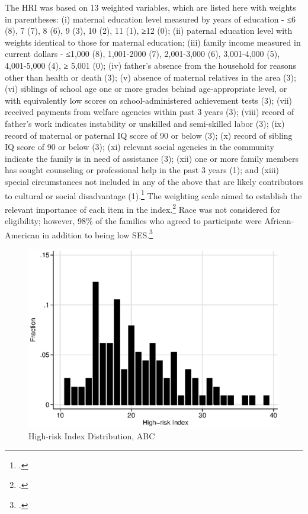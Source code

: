\begin{appendices}
\noindent The HRI was based on 13 weighted variables, which are listed here with weights in parentheses: (i) maternal education level measured by years of education - ≤6 (8), 7 (7), 8 (6), 9 (3), 10 (2), 11 (1), ≥12 (0); (ii) paternal education level with weights identical to those for maternal education; (iii) family income measured in current dollars - ≤1,000 (8), 1,001-2000 (7), 2,001-3,000 (6), 3,001-4,000 (5), 4,001-5,000 (4), ≥ 5,001 (0); (iv) father’s absence from the household for reasons other than health or death (3); (v) absence of maternal relatives in the area (3); (vi) siblings of school age one or more grades behind age-appropriate level, or with equivalently low scores on school-administered achievement tests (3); (vii) received payments from welfare agencies within past 3 years (3); (viii) record of father's work indicates instability or unskilled and semi-skilled labor (3); (ix) record of maternal or paternal IQ score of 90 or below (3); (x) record of sibling IQ score of 90 or below (3); (xi) relevant social agencies in the community indicate the family is in need of assistance (3); (xii) one or more family members has sought counseling or professional help in the past 3 years (1); and (xiii) special circumstances not included in any of the above that are likely contributors to cultural or social disadvantage (1).\footnote{\citet{Ramey_Smith_1977_AJMD, Ramey_Campbell_1984_AJMD,Ramey_Campbell_1991_childreninpoverty,Ramey_Campbell_etal_2000_ADS}.} The weighting scale aimed to establish the relevant importance of each item in the index.\footnote{\citet{Ramey_Smith_1977_AJMD}.} Race was not  considered for eligibility; however, 98\% of the families who agreed to participate were African-American in addition to being low SES.\footnote{\citet{Ramey_Smith_1977_AJMD,Ramey_Campbell_1979_SR}.} \\

\begin{center}
	\begin{figure}[H]
		\caption{High-risk Index Distribution, ABC} \label{figure:hridistabc}
		\centering
		\includegraphics[width=.9\columnwidth]{output/abc_hri.eps}
	\end{figure}
\end{center}


\end{appendices}
